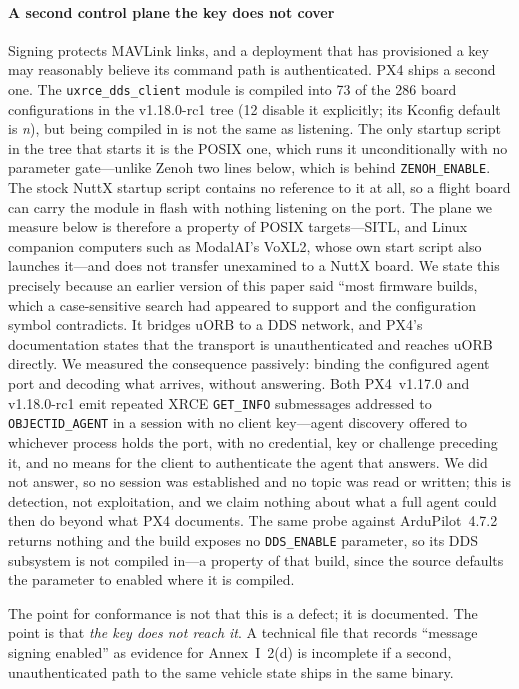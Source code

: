 \documentclass[conference]{IEEEtran}
\newcommand{\code}[1]{\texttt{#1}}
\begin{document}
\paragraph*{A second control plane the key does not cover}
Signing protects MAVLink links, and a deployment that has provisioned a key may
reasonably believe its command path is authenticated. PX4 ships a second one.
The \code{uxrce\_dds\_client} module is compiled into 73 of the 286 board
configurations in the v1.18.0-rc1 tree (12 disable it explicitly; its Kconfig
default is \emph{n}), but being compiled in is not the same as listening. The
only startup script in the tree that starts it is the POSIX one, which runs it
unconditionally with no parameter gate---unlike Zenoh two lines below, which is
behind \code{ZENOH\_ENABLE}. The stock NuttX startup script contains no
reference to it at all, so a flight board can carry the module in flash with
nothing listening on the port. The plane we measure below is therefore a
property of POSIX targets---SITL, and Linux companion computers such as
ModalAI's VoXL2, whose own start script also launches it---and does not
transfer unexamined to a NuttX board. We state this precisely because an
earlier version of this paper said ``most firmware builds, which a
case-sensitive search had appeared to support and the configuration symbol
contradicts. It bridges uORB to a DDS network,
and PX4's documentation states that the transport is unauthenticated and reaches
uORB directly. We measured the consequence passively: binding the configured
agent port and decoding what arrives, without answering. Both PX4~v1.17.0 and
v1.18.0-rc1 emit repeated XRCE \code{GET\_INFO} submessages addressed to
\code{OBJECTID\_AGENT} in a session with no client key---agent discovery offered
to whichever process holds the port, with no credential, key or challenge
preceding it, and no means for the client to authenticate the agent that
answers. We did not answer, so no session was established and no topic was read
or written; this is detection, not exploitation, and we claim nothing about what
a full agent could then do beyond what PX4 documents. The same probe against
ArduPilot~4.7.2 returns nothing and the build exposes no \code{DDS\_ENABLE}
parameter, so its DDS subsystem is not compiled in---a property of that build,
since the source defaults the parameter to enabled where it is compiled.

The point for conformance is not that this is a defect; it is documented. The
point is that \emph{the key does not reach it}. A technical file that records
``message signing enabled'' as evidence for Annex~I~2(d) is incomplete if a
second, unauthenticated path to the same vehicle state ships in the same binary.
\end{document}
